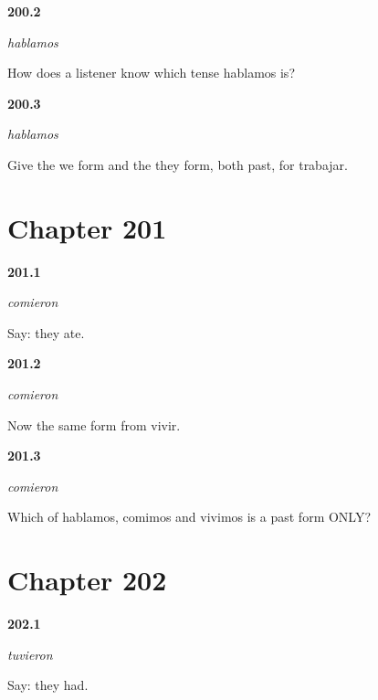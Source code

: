 \noindent\begin{minipage}[t]{\linewidth}
\raggedright
\hypertarget{review-ES-C55-hablamos-dos-which}{\textbf{200.2}} \emph{hablamos}\par
\small How does a listener know which tense hablamos is?
\end{minipage}\par\medskip

\noindent\begin{minipage}[t]{\linewidth}
\raggedright
\hypertarget{review-ES-C55-hablamos-dos-pair}{\textbf{200.3}} \emph{hablamos}\par
\small Give the we form and the they form, both past, for trabajar.
\end{minipage}\par\medskip

\section*{Chapter 201}

\noindent\begin{minipage}[t]{\linewidth}
\raggedright
\hypertarget{review-ES-C55-comieron-say}{\textbf{201.1}} \emph{comieron}\par
\small Say: they ate.
\end{minipage}\par\medskip

\noindent\begin{minipage}[t]{\linewidth}
\raggedright
\hypertarget{review-ES-C55-comieron-vivir}{\textbf{201.2}} \emph{comieron}\par
\small Now the same form from vivir.
\end{minipage}\par\medskip

\noindent\begin{minipage}[t]{\linewidth}
\raggedright
\hypertarget{review-ES-C55-comieron-contrast}{\textbf{201.3}} \emph{comieron}\par
\small Which of hablamos, comimos and vivimos is a past form ONLY?
\end{minipage}\par\medskip

\section*{Chapter 202}

\noindent\begin{minipage}[t]{\linewidth}
\raggedright
\hypertarget{review-ES-C55-tuvieron-say}{\textbf{202.1}} \emph{tuvieron}\par
\small Say: they had.
\end{minipage}\par\medskip

